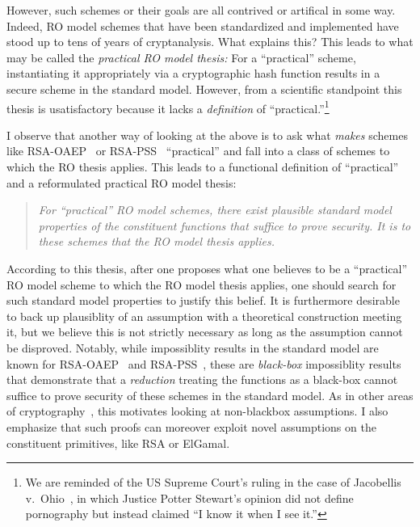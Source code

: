 However, such schemes or their goals are all contrived or artifical in some way.  Indeed, RO model schemes that have been standardized and implemented have stood up to tens of years of cryptanalysis.  What explains this?  This leads to what may be called the \emph{practical RO model thesis:} For a ``practical'' scheme, instantiating it  appropriately via  a cryptographic hash function results in a secure scheme in the standard model.  However, from a scientific standpoint this thesis is usatisfactory because it lacks a \emph{definition} of  ``practical.''\footnote{We are reminded of the US Supreme Court's ruling in the case of Jacobellis v.~Ohio~\cite{wiki:JO}, in which Justice Potter Stewart's opinion did not define pornography but instead claimed ``I know it when I see it.''}  

I observe that another way of looking at the above is to ask what \emph{makes} schemes like RSA-OAEP~\cite{EC:BelRog94} or RSA-PSS~\cite{EC:BelRog96} ``practical'' and fall into a class of schemes to which the RO thesis applies.  This leads to a functional definition of ``practical'' and a reformulated practical RO model thesis:

\begin{quote} \label{ques1}\emph{
For ``practical'' RO model schemes, there exist plausible standard model properties of the constituent functions that suffice to prove security. It is to these schemes that the RO model thesis applies.}
\end{quote}

According to this thesis, after one proposes what one believes to be a ``practical'' RO model scheme to which the RO model thesis applies, one should search for such standard model properties to justify this belief.  It is furthermore desirable to back up plausiblity of an assumption with a theoretical construction meeting it, but we believe this is not strictly necessary as long as the assumption cannot be disproved. 	Notably, while impossiblity results in the standard model are known for RSA-OAEP~\cite{EC:KilPie09} and RSA-PSS~\cite{C:DodOliPie05,TCC:DodHaiTen12}, these are \emph{black-box} impossiblity results that demonstrate that a \emph{reduction} treating the functions as a black-box cannot suffice to prove security of these schemes in the standard model.  As in other areas of cryptography~\cite{FOCS:Barak01}, this motivates looking at non-blackbox assumptions.  I also emphasize that such proofs can moreover exploit novel assumptions on the constituent primitives, like RSA or ElGamal.

